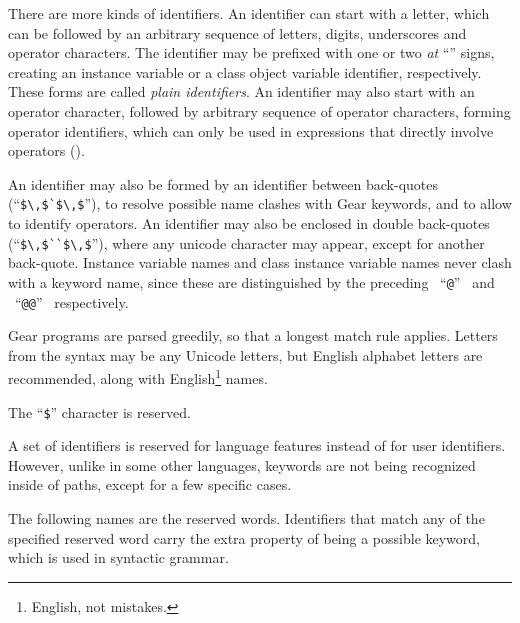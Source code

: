 There are more kinds of identifiers. An identifier can start with a letter, which can be followed by an arbitrary sequence of letters, digits, underscores and operator characters. The identifier may be prefixed with one or two {\em at} ``'' signs, creating an instance variable or a class object variable identifier, respectively. These forms are called {\em plain identifiers}. An identifier may also start with an operator character, followed by arbitrary sequence of operator characters, forming operator identifiers, which can only be used in expressions that directly involve operators (). 

An identifier may also be formed by an identifier between back-quotes (``\lstinline!$\,$`$\,$!''), to resolve possible name clashes with Gear keywords, and to allow to identify operators. An identifier may also be enclosed in double back-quotes (``\lstinline!$\,$``$\,$!''), where any unicode character may appear, except for another back-quote. Instance variable names and class instance variable names never clash with a keyword name, since these are distinguished by the preceding ~``\lstinline!@!''~ and ~``\lstinline!@@!''~ respectively. 

Gear programs are parsed greedily, so that a longest match rule applies. Letters from the syntax may be any Unicode letters, but English alphabet letters are recommended, along with English\footnote{English, not mistakes.} names.

The ``\lstinline[mathescape=false]!$!'' character is reserved. 

A set of identifiers is reserved for language features instead of for user identifiers. However, unlike in some other languages, keywords are not being recognized inside of paths, except for a few specific cases.

The following names are the reserved words. Identifiers that match any of the specified reserved word carry the extra property of being a possible keyword, which is used in syntactic grammar. 

